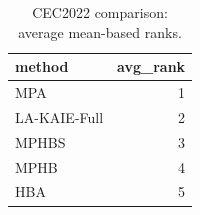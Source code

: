 \begin{table}[t]
\centering
\scriptsize
\caption{CEC2022 comparison: average mean-based ranks.}
\label{tab:cec2022_comparison_ranks}
\begin{tabular}{lr}
\toprule
method & avg\_rank \\
\midrule
MPA & 1 \\
LA-KAIE-Full & 2 \\
MPHBS & 3 \\
MPHB & 4 \\
HBA & 5 \\
\bottomrule
\end{tabular}
\end{table}
